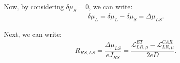 Now, by considering $\delta\mu_{S}=0$, we can write:
\begin{align*}
\delta\mu_{L}=\delta\mu_{L}-\delta\mu_{S}=\Delta\mu_{LS}.
\end{align*}

Next, we can write:
\begin{align}\label{R:RS:LS:intermed}
R_{RS,LS}=\dfrac{\Delta\mu_{LS}}{eJ_{RS}}=\dfrac{\mathcal{L}_{LR,\mu}^{ET}-\mathcal{L}_{LR,\mu}^{CAR}}{2eD}.
\end{align}